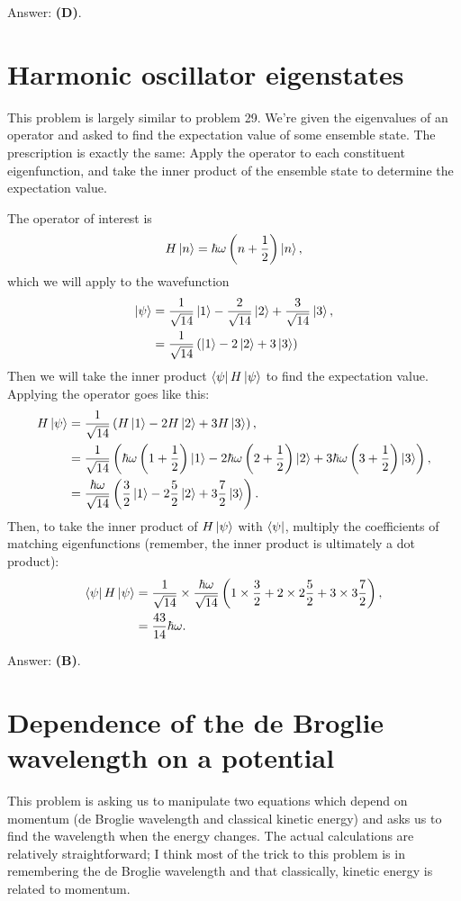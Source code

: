 \documentclass[11pt]{paper}
\newcommand{\answer}[1]{Answer: \textbf{(#1)}.}
\begin{document}
\answer{D}

\section{Harmonic oscillator eigenstates}
This problem is largely similar to problem 29.  We're given the eigenvalues of an operator and asked to find the expectation value of some ensemble state.  The prescription is exactly the same:  Apply the operator to each constituent eigenfunction, and take the inner product of the ensemble state to determine the expectation value.

The operator of interest is
\begin{equation}
H\ket{n} = \hbar \omega \left(n+\frac{1}{2}\right)\ket{n},
\end{equation}
which we will apply to the wavefunction
\begin{align}
\ket{\psi} &= \frac{1}{\sqrt{14}}\ket{1} - \frac{2}{\sqrt{14}}\ket{2} + \frac{3}{\sqrt{14}}\ket{3},\\
&= \frac{1}{\sqrt{14}}\left(\ket{1} - 2\ket{2} + 3\ket{3}\right)
\end{align}
Then we will take the inner product $\bra{\psi}H\ket{\psi}$ to find the expectation value.  Applying the operator goes like this:
\begin{align}
H\ket{\psi} &=  \frac{1}{\sqrt{14}}\left(H\ket{1} - 2H\ket{2} + 3H\ket{3}\right),\\
&=  \frac{1}{\sqrt{14}}\left(\hbar \omega \left(1+\frac{1}{2}\right)\ket{1} - 2\hbar \omega \left(2+\frac{1}{2}\right)\ket{2} + 3\hbar \omega \left(3+\frac{1}{2}\right)\ket{3}\right),\\
&= \frac{\hbar \omega}{\sqrt{14}}\left( \frac{3}{2}\ket{1} - 2 \frac{5}{2}\ket{2} + 3 \frac{7}{2}\ket{3}\right).
\end{align}
Then, to take the inner product of $H\ket{\psi}$ with $\bra{\psi}$, multiply the coefficients of matching eigenfunctions (remember, the inner product is ultimately a dot product):
\begin{align}
\bra{\psi}H\ket{\psi} &= \frac{1}{\sqrt{14}} \times \frac{\hbar\omega}{\sqrt{14}}\left(1\times\frac{3}{2} + 2\times2 \frac{5}{2}+3\times 3 \frac{7}{2}\right),\\
&= \frac{43}{14}\hbar\omega.
\end{align}

\answer{B}

\section{Dependence of the de Broglie wavelength on a potential}
This problem is asking us to manipulate two equations which depend on momentum (de Broglie wavelength and classical kinetic energy) and asks us to find the wavelength when the energy changes.  The actual calculations are relatively straightforward; I think most of the trick to this problem is in remembering the de Broglie wavelength and that classically, kinetic energy is related to momentum.
\end{document}
